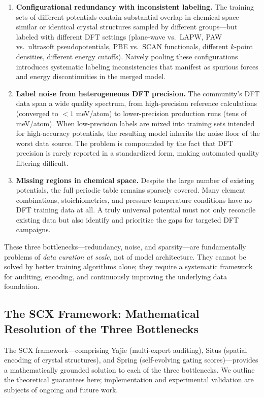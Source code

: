 \documentclass[twoside,prb,aps,floatfix,superscriptaddress,longbibliography]{revtex4-2}
\begin{document}
\begin{enumerate}[label=\textbf{(B\arabic*)}]
    \item \textbf{Configurational redundancy with inconsistent labeling.} The training sets of different potentials contain substantial overlap in chemical space---similar or identical crystal structures sampled by different groups---but labeled with different DFT settings (plane-wave vs.\ LAPW, PAW vs.\ ultrasoft pseudopotentials, PBE vs.\ SCAN functionals, different $k$-point densities, different energy cutoffs). Naively pooling these configurations introduces systematic labeling inconsistencies that manifest as spurious forces and energy discontinuities in the merged model.
    \item \textbf{Label noise from heterogeneous DFT precision.} The community's DFT data span a wide quality spectrum, from high-precision reference calculations (converged to $<1$ meV/atom) to lower-precision production runs (tens of meV/atom). When low-precision labels are mixed into training sets intended for high-accuracy potentials, the resulting model inherits the noise floor of the worst data source. The problem is compounded by the fact that DFT precision is rarely reported in a standardized form, making automated quality filtering difficult.
    \item \textbf{Missing regions in chemical space.} Despite the large number of existing potentials, the full periodic table remains sparsely covered. Many element combinations, stoichiometries, and pressure-temperature conditions have no DFT training data at all. A truly universal potential must not only reconcile existing data but also identify and prioritize the gaps for targeted DFT campaigns.
\end{enumerate}

These three bottlenecks---redundancy, noise, and sparsity---are fundamentally problems of \emph{data curation at scale}, not of model architecture. They cannot be solved by better training algorithms alone; they require a systematic framework for auditing, encoding, and continuously improving the underlying data foundation.

\subsection{The SCX Framework: Mathematical Resolution of the Three Bottlenecks}

The SCX framework---comprising Yajie (multi-expert auditing), Situs (spatial encoding of crystal structures), and Spring (self-evolving gating scores)---provides a mathematically grounded solution to each of the three bottlenecks. We outline the theoretical guarantees here; implementation and experimental validation are subjects of ongoing and future work.
\end{document}
